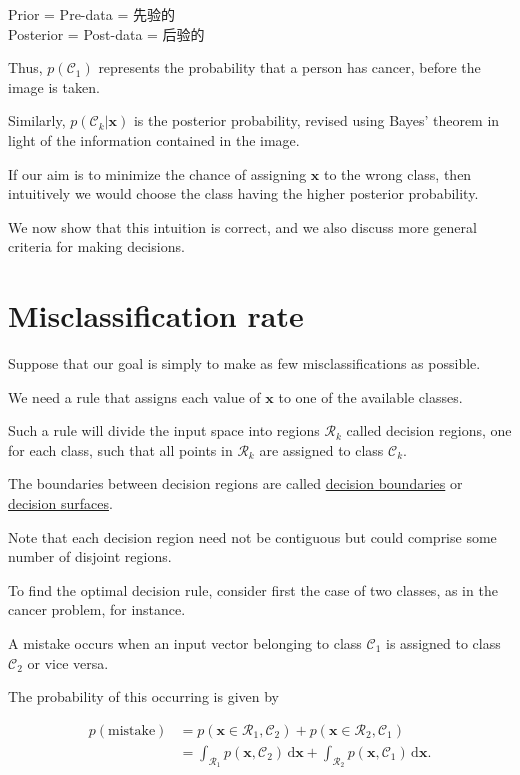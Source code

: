 \documentclass{article}
\begin{document}
{\color{red}
Prior = Pre-data = 先验的\\ 
Posterior = Post-data = 后验的
}

Thus, $p(\mathcal{C}_{1})$ represents the probability that a person has cancer, before the image is taken. 

Similarly, $p(\mathcal{C}_{k}|\mathbf{x})$ is the posterior probability, revised using Bayes' theorem in light of the information contained in the image. 

If our aim is to minimize the chance of assigning $\mathbf{x}$ to the wrong class, then intuitively we would choose the class having the higher posterior probability. 

We now show that this intuition is correct, and we also discuss more general criteria for making decisions.

\section{Misclassification rate}

Suppose that our goal is simply to make as few misclassifications as possible. 

We need a rule that assigns each value of $\mathbf{x}$ to one of the available classes. 

Such a rule will divide the input space into regions $\mathcal{R}_{k}$ called decision regions, one for each class, such that all points in $\mathcal{R}_{k}$ are assigned to class $\mathcal{C}_{k}$. 

The boundaries between decision regions are called \underline{\color{red}decision boundaries} or \underline{\color{red}decision surfaces}. 

Note that each decision region need not be contiguous but could comprise some number of disjoint regions. 

To find the optimal decision rule, consider first the case of two classes, as in the cancer problem, for instance. 

A mistake occurs when an input vector belonging to class $\mathcal{C}_{1}$ is assigned to class $\mathcal{C}_{2}$ or vice versa. 

The probability of this occurring is given by

\begin{align}
p(\text{mistake}) &= p(\mathbf{x}\in\mathcal{R}_{1},\mathcal{C}_{2}) + p(\mathbf{x}\in\mathcal{R}_{2},\mathcal{C}_{1}) \\
&= \int_{\mathcal{R}_{1}}p(\mathbf{x},\mathcal{C}_{2})\,\mathrm{d}\mathbf{x} + \int_{\mathcal{R}_{2}}p(\mathbf{x},\mathcal{C}_{1})\,\mathrm{d}\mathbf{x}.
\tag{5.20}
\end{align}
\end{document}
